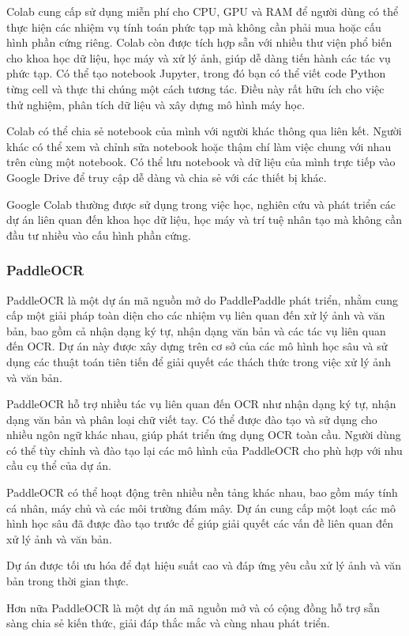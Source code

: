 Colab cung cấp sử dụng miễn phí cho CPU, GPU và RAM để người dùng có thể thực hiện các nhiệm vụ tính toán phức tạp mà không cần phải mua hoặc cấu hình phần cứng riêng. Colab còn được tích hợp sẵn với nhiều thư viện phổ biến cho khoa học dữ liệu, học máy và xử lý ảnh, giúp dễ dàng tiến hành các tác vụ phức tạp. Có thể tạo notebook Jupyter, trong đó bạn có thể viết code Python từng cell và thực thi chúng một cách tương tác. Điều này rất hữu ích cho việc thử nghiệm, phân tích dữ liệu và xây dựng mô hình máy học.

Colab có thể chia sẻ notebook của mình với người khác thông qua liên kết. Người khác có thể xem và chỉnh sửa notebook hoặc thậm chí làm việc chung với nhau trên cùng một notebook. Có thể lưu notebook và dữ liệu của mình trực tiếp vào Google Drive để truy cập dễ dàng và chia sẻ với các thiết bị khác.

Google Colab thường được sử dụng trong việc học, nghiên cứu và phát triển các dự án liên quan đến khoa học dữ liệu, học máy và trí tuệ nhân tạo mà không cần đầu tư nhiều vào cấu hình phần cứng.

\subsubsection{PaddleOCR}
PaddleOCR là một dự án mã nguồn mở do PaddlePaddle phát triển, nhằm cung cấp một giải pháp toàn diện cho các nhiệm vụ liên quan đến xử lý ảnh và văn bản, bao gồm cả nhận dạng ký tự, nhận dạng văn bản và các tác vụ liên quan đến OCR. Dự án này được xây dựng trên cơ sở của các mô hình học sâu và sử dụng các thuật toán tiên tiến để giải quyết các thách thức trong việc xử lý ảnh và văn bản.

PaddleOCR hỗ trợ nhiều tác vụ liên quan đến OCR như nhận dạng ký tự, nhận dạng văn bản và phân loại chữ viết tay. Có thể được đào tạo và sử dụng cho nhiều ngôn ngữ khác nhau, giúp phát triển ứng dụng OCR toàn cầu. Người dùng có thể tùy chỉnh và đào tạo lại các mô hình của PaddleOCR cho phù hợp với nhu cầu cụ thể của dự án.

PaddleOCR có thể hoạt động trên nhiều nền tảng khác nhau, bao gồm máy tính cá nhân, máy chủ và các môi trường đám mây. Dự án cung cấp một loạt các mô hình học sâu đã được đào tạo trước để giúp giải quyết các vấn đề liên quan đến xử lý ảnh và văn bản.

Dự án được tối ưu hóa để đạt hiệu suất cao và đáp ứng yêu cầu xử lý ảnh và văn bản trong thời gian thực.

Hơn nữa PaddleOCR là một dự án mã nguồn mở và có cộng đồng hỗ trợ sẵn sàng chia sẻ kiến thức, giải đáp thắc mắc và cùng nhau phát triển.

